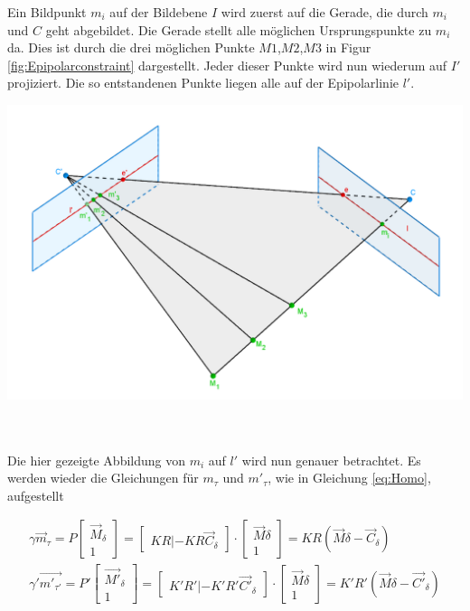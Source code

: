 Ein Bildpunkt $m_i$ auf der Bildebene $I$ wird zuerst auf die Gerade, die durch $m_i$ und $C$ geht abgebildet. Die Gerade stellt alle möglichen Ursprungspunkte zu $m_i$ da. Dies ist durch die drei möglichen Punkte $M1$,$M2$,$M3$ in Figur \ref{fig:Epipolarconstraint} dargestellt. Jeder dieser Punkte wird nun wiederum auf $I'$ projiziert. Die so entstandenen Punkte liegen alle auf der Epipolarlinie $l'$\cite{HZ}. 

\begin{minipage}{\linewidth}
	\centering
	\includegraphics[width=.8\linewidth]{images/EpipolarLinien.png}
	\label{fig:Epipolarconstraint}
\end{minipage}\\ \\



Die hier gezeigte Abbildung von $m_i$ auf $l'$ wird nun genauer betrachtet. Es werden wieder die Gleichungen für $m_\tau$ und $m'_\tau$, wie in Gleichung \ref{eq:Homo}, aufgestellt    

\begin{gather}
	\gamma \vec{m}_\tau = P \begin{bmatrix}\vec{M}_\delta\\1\end{bmatrix} = 
	\begin{bmatrix}KR|-KR\vec{C}_\delta\end{bmatrix}\cdot \begin{bmatrix}\vec{M}\delta\\1\end{bmatrix} = KR(\vec{M}\delta - \vec{C}_\delta) \label{eq:Ep1} \\
	\gamma' \vec{m'_{\tau'}} = P' \begin{bmatrix}\vec{M'}_\delta\\1\end{bmatrix} = 
	\begin{bmatrix}K'R'|-K'R'\vec{C'}_\delta\end{bmatrix}\cdot \begin{bmatrix}\vec{M}\delta\\1\end{bmatrix} = K'R'(\vec{M}\delta - \vec{C'}_\delta)\label{eq:Ep2}
\end{gather}


